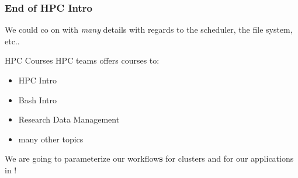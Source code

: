 \begin{frame}
  \frametitle{End of HPC Intro}
  We could co on with \emph{many} details with regards to the scheduler, the file system, etc..
  \begin{block}{HPC Courses}
   HPC teams offers courses to:
   \begin{itemize}
    \item HPC Intro
    \item Bash Intro
    \item Research Data Management
    \item many other topics
   \end{itemize}
  \end{block}
  \pause
  \begin{hint}
      We are going to parameterize our workflow\textbf{s} for clusters and for our applications in \Snakemake!
  \end{hint}
\end{frame}





